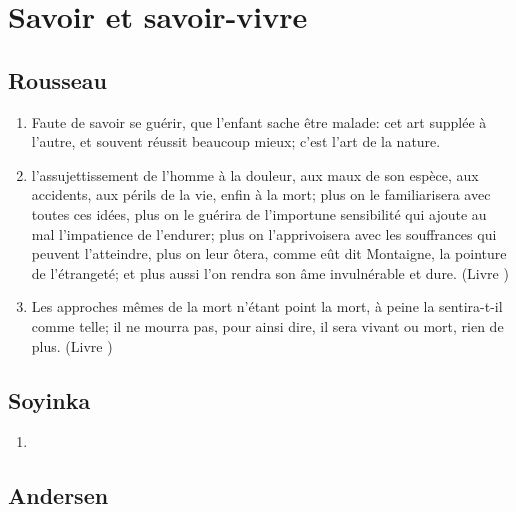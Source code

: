 \documentclass[a4paper, 11pt, hidelinks]{article}
\newcommand{\rb}[1]{\Romanbar{#1}}
\begin{document}
\section{Savoir et savoir-vivre}



\subsection{Rousseau}


\begin{enumerate}
    \item Faute de savoir se guérir, que l'enfant sache être malade: cet art supplée à l'autre, et souvent réussit beaucoup mieux; c'est l'art de la nature. \rb{1}
    \item l'assujettissement de l'homme à la douleur, aux maux de son espèce, aux accidents, aux périls de la vie, enfin à la mort; plus on le familiarisera avec toutes ces idées, plus on le guérira de l'importune sensibilité qui ajoute au mal l'impatience de l'endurer; plus on l'apprivoisera avec les souffrances qui peuvent l'atteindre, plus on leur ôtera, comme eût dit Montaigne, la pointure de l'étrangeté; et plus aussi l'on rendra son âme invulnérable et dure. (Livre \rb{2})
    \item Les approches mêmes de la mort n'étant point la mort, à peine la sentira-t-il comme telle; il ne mourra pas, pour ainsi dire, il sera vivant ou mort, rien de plus. (Livre \rb{2})
\end{enumerate}



\subsection{Soyinka}


\begin{enumerate}
    \item 
\end{enumerate}




\subsection{Andersen}
\end{document}
